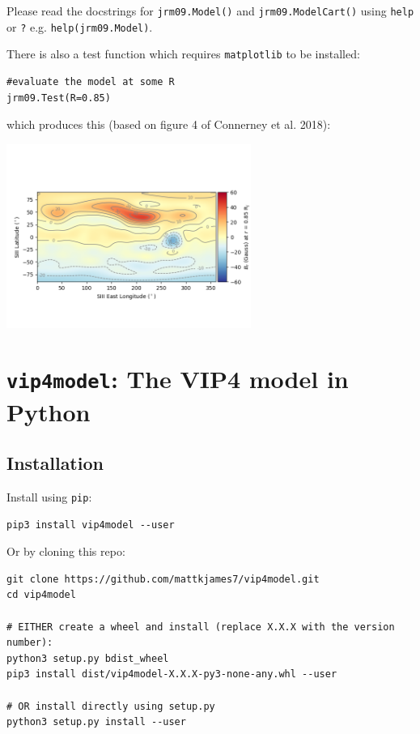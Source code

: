 	
	Please read the docstrings for \texttt{jrm09.Model()} and \texttt{jrm09.ModelCart()} using \texttt{help} or \texttt{?} e.g. \texttt{help(jrm09.Model)}.
	
	There is also a test function which requires \texttt{matplotlib} to be installed:
	
	\begin{verbatim}
#evaluate the model at some R
jrm09.Test(R=0.85)
	\end{verbatim}
	
	which produces this (based on figure 4 of Connerney et al. 2018):
	
	\begin{center}
		\includegraphics[width=0.6\textwidth]{figures/ch3_jrm09test.png}
	\end{center}


	\section{\texttt{vip4model}: The VIP4 model in Python}
	
	\subsection{Installation}

Install using \texttt{pip}:

\begin{verbatim}
pip3 install vip4model --user
\end{verbatim}

Or by cloning this repo:

\begin{verbatim}
git clone https://github.com/mattkjames7/vip4model.git
cd vip4model

# EITHER create a wheel and install (replace X.X.X with the version number):
python3 setup.py bdist_wheel
pip3 install dist/vip4model-X.X.X-py3-none-any.whl --user

# OR install directly using setup.py
python3 setup.py install --user
\end{verbatim}


